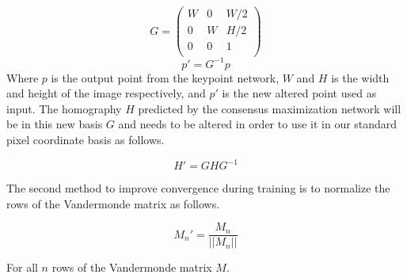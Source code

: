 \[
G=
\begin{pmatrix}
W & 0 & W/2 \\
0 & W & H/2 \\
0 & 0 & 1 \\
\end{pmatrix}
\]
\[
p' = G^{-1} p
\]
Where $p$ is the output point from the keypoint network, $W$ and $H$ is the width and height of the image respectively, and $p'$ is the new altered point used as input. The homography $H$ predicted by the consensus maximization network will be in this new basis $G$ and needs to be altered in order to use it in our standard pixel coordinate basis as follows.

\[
H' = G H G^{-1}
\]

The second method to improve convergence during training is to normalize the rows of the Vandermonde matrix as follows.

\[
M_n' = \frac{M_n}{||M_n||}
\]

For all $n$ rows of the Vandermonde matrix $M$.





